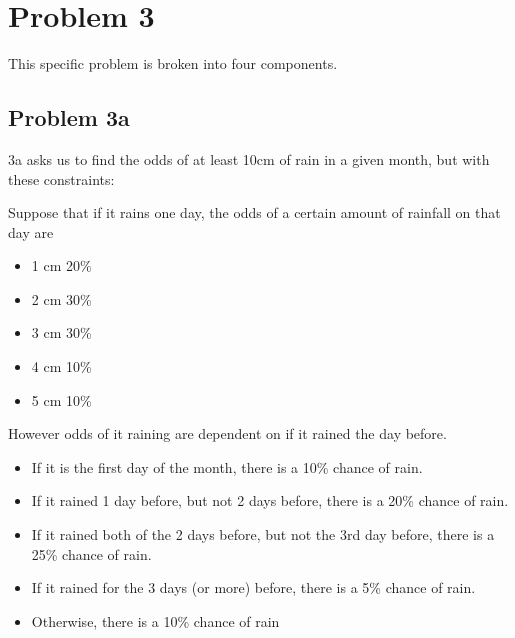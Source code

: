 \documentclass[twocolumn]{revtex4}
\begin{document}
\section{Problem 3}

This specific problem is broken into four components. 

\subsection{Problem 3a}
3a asks us to find the odds of at least 10cm of rain in a given month, but with these constraints:\newline

Suppose that if it rains one day, the odds of a certain amount of rainfall on that day are
\begin{itemize}
  \item 1 cm 20\%
  \item 2 cm 30\%
  \item 3 cm 30\%
  \item 4 cm 10\%
  \item 5 cm 10\%
\end{itemize}
 
However odds of it raining are dependent on if it rained the day before.

\begin{itemize}
  \item If it is the first day of the month, there is a 10\% chance of rain.
  \item If it rained 1 day before, but not 2 days before, there is a 20\% chance of rain.
  \item If it rained both of the 2 days before, but not the 3rd day before, there is a 25\% chance of rain.
  \item If it rained for the 3 days (or more) before, there is a 5\% chance of rain.
  \item Otherwise, there is a 10\% chance of rain

\end{itemize}
\end{document}
